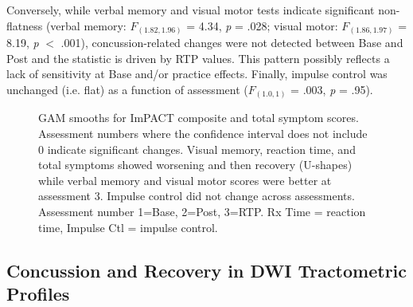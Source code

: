 \documentclass[12pt]{article}
\begin{document}
Conversely, while verbal memory and visual motor tests indicate significant non-flatness (verbal memory: $F_{(1.82, 1.96)}$ = 4.34, \textit{p} = .028; visual motor: $F_{(1.86, 1.97)}$ = 8.19, \textit{p} $<$ .001), concussion-related changes were not detected between Base and Post and the statistic is driven by RTP values. This pattern possibly reflects a lack of sensitivity at Base and/or practice effects. Finally, impulse control was unchanged (i.e. flat) as a function of assessment ($F_{(1.0, 1)}$ = .003, \textit{p} = .95).

\begin{figure}[H]
	\centering
	\caption{GAM smooths for ImPACT composite and total symptom scores. Assessment numbers where the confidence interval does not include 0 indicate significant changes. Visual memory, reaction time, and total symptoms showed worsening and then recovery (U-shapes) while verbal memory and visual motor scores were better at assessment 3. Impulse control did not change across assessments. Assessment number 1=Base, 2=Post, 3=RTP. Rx Time = reaction time, Impulse Ctl = impulse control.}
	\label{fig:imp-gam}
\end{figure}


\subsection{Concussion and Recovery in DWI Tractometric Profiles}
\label{ssec:res-dwi-tract}
\end{document}
